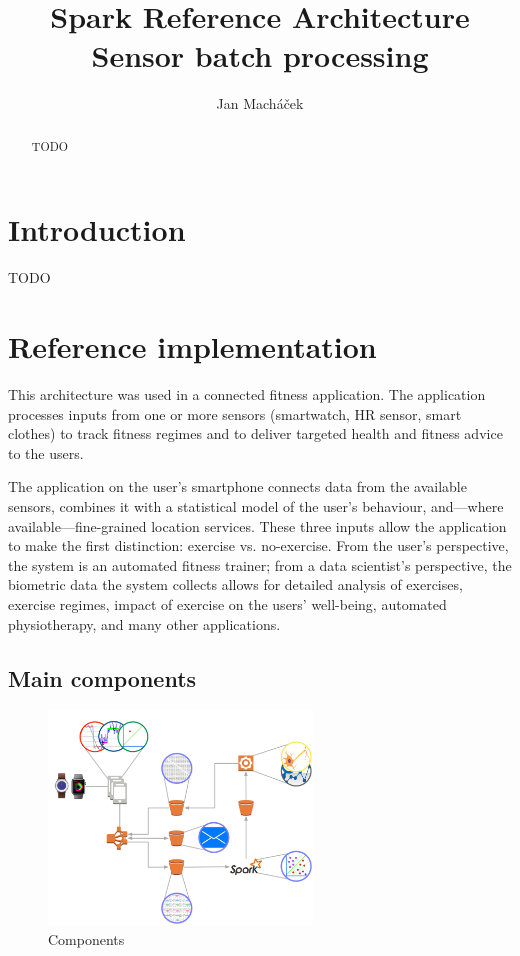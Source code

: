 \documentclass[a4paper, 10 pt, conference]{IEEEtran}
\title{Spark Reference Architecture \\ Sensor batch processing}
\author{Jan Mach{\'a}\v{c}ek%
}
\begin{document}
\maketitle
\thispagestyle{empty}
\pagestyle{empty}

\begin{abstract}

TODO

\end{abstract}


\section{Introduction}

TODO

\section{Reference implementation}

This architecture was used in a connected fitness application. The application processes inputs from one or more sensors (smartwatch, HR sensor, smart clothes) to track fitness regimes and to deliver targeted health and fitness advice to the users. 

The application on the user's smartphone connects data from the available sensors, combines it with a statistical model of the user's behaviour, and---where available---fine-grained location services. These three inputs allow the application to make the first distinction: exercise vs. no-exercise. From the user's perspective, the system is an automated fitness trainer; from a data scientist's perspective, the biometric data the system collects allows for detailed analysis of exercises, exercise regimes, impact of exercise on the users' well-being, automated physiotherapy, and many other applications.

\subsection{Main components}

\begin{figure}[hb]
    \begin{center}
        \caption{Components}
        \label{fig:components}
        \includegraphics[width=7cm,keepaspectratio]{ri-arch.png}
    \end{center}
\end{figure}
\end{document}
